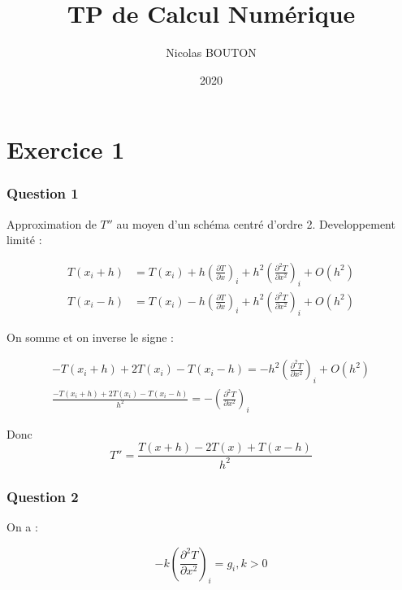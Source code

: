 \documentclass[11pt]{article}
\title{TP de Calcul Numérique}
\author{Nicolas BOUTON}
\date{2020}
\begin{document}
\maketitle

\section{Exercice 1}

\subsubsection{Question 1}

Approximation de $T''$ au moyen d'un schéma centré d'ordre 2.
\vspace{5mm}
Developpement limité : 

\begin{equation*}
  \begin{split}
    T(x_i + h) & = T(x_i) + h \left(\frac{\partial T}{\partial x} \right)_i + h^2 \left(\frac{\partial^2 T}{\partial x^2} \right)_i + O(h^2) \\
    T(x_i - h) & = T(x_i) - h \left(\frac{\partial T}{\partial x} \right)_i + h^2 \left(\frac{\partial^2 T}{\partial x^2} \right)_i + O(h^2)
  \end{split}
\end{equation*}

On somme et on inverse le signe :

\begin{equation*}
  \begin{split}
    - T(x_i + h) + 2 T(x_i) - T(x_i - h) = - h^2 \left(\frac{\partial^2 T}{\partial x^2} \right)_i + O(h^2) \\
    \frac{- T(x_i + h) + 2 T(x_i) - T(x_i - h)}{h^2} = - \left(\frac{\partial^2 T}{\partial x^2} \right)_i
  \end{split}
\end{equation*}

Donc
\begin{equation*}
  T'' = \frac{T(x + h) - 2 T(x) + T(x - h)}{h^2}
\end{equation*}

\subsubsection{Question 2}

On a :

\begin{equation*}
  - k \left( \frac{\partial^2 T}{\partial x^2} \right)_i = g_i, k > 0
\end{equation*}
\end{document}
